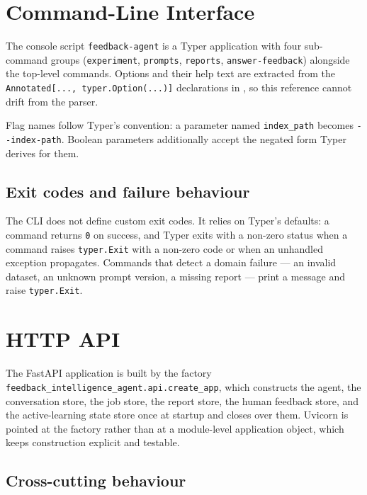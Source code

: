 

\chapter{Command-Line Interface}
\label{ch:cli}

The console script \texttt{feedback-agent} is a Typer application with four
sub-command groups (\texttt{experiment}, \texttt{prompts}, \texttt{reports},
\texttt{answer-feedback}) alongside the top-level commands. Options and their
help text are extracted from the \texttt{Annotated[..., typer.Option(...)]}
declarations in , so this
reference cannot drift from the parser.

Flag names follow Typer's convention: a parameter named \texttt{index\_path}
becomes \texttt{-{}-index-path}. Boolean parameters additionally accept the
negated form Typer derives for them.

\section{Exit codes and failure behaviour}

The CLI does not define custom exit codes. It relies on Typer's defaults: a
command returns \texttt{0} on success, and Typer exits with a non-zero status
when a command raises \texttt{typer.Exit} with a non-zero code or when an
unhandled exception propagates. Commands that detect a domain failure --- an
invalid dataset, an unknown prompt version, a missing report --- print a
message and raise \texttt{typer.Exit}.



\chapter{HTTP API}
\label{ch:http}

The FastAPI application is built by the factory
\texttt{feedback\_intelligence\_agent.api.create\_app}, which constructs the
agent, the conversation store, the job store, the report store, the human
feedback store, and the active-learning state store once at startup and closes
over them. Uvicorn is pointed at the factory rather than at a module-level
application object, which keeps construction explicit and testable.

\section{Cross-cutting behaviour}

